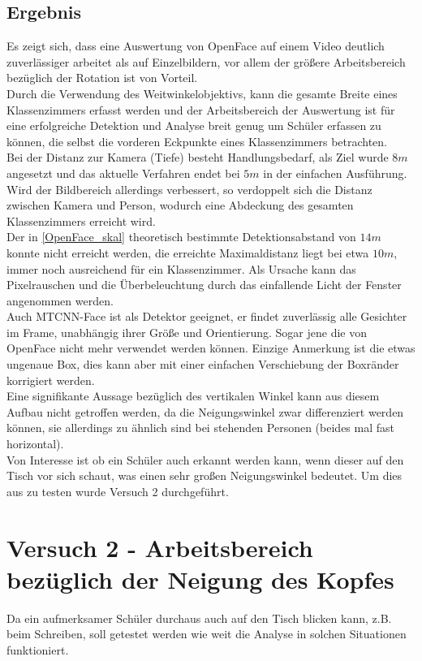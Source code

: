 \subsection{Ergebnis}
Es zeigt sich, dass eine Auswertung von OpenFace auf einem Video deutlich zuverlässiger arbeitet als auf Einzelbildern, vor allem der größere Arbeitsbereich bezüglich der Rotation ist von Vorteil.\\
Durch die Verwendung des Weitwinkelobjektivs, kann die gesamte Breite eines Klassenzimmers erfasst werden und der Arbeitsbereich der Auswertung ist für eine erfolgreiche Detektion und Analyse breit genug um Schüler erfassen zu können, die selbst die vorderen Eckpunkte eines Klassenzimmers betrachten.\\
Bei der Distanz zur Kamera (Tiefe) besteht Handlungsbedarf, als Ziel wurde $8m$ angesetzt und das aktuelle Verfahren endet bei $5m$ in der einfachen Ausführung. Wird der Bildbereich allerdings verbessert, so verdoppelt sich die Distanz zwischen Kamera und Person, wodurch eine Abdeckung des gesamten Klassenzimmers erreicht wird.\\
Der in \autoref{OpenFace_skal} theoretisch bestimmte Detektionsabstand von $14m$ konnte nicht erreicht werden, die erreichte Maximaldistanz liegt bei etwa $10m$, immer noch ausreichend für ein Klassenzimmer. Als Ursache kann das Pixelrauschen und die Überbeleuchtung durch das einfallende Licht der Fenster angenommen werden.\\
Auch MTCNN-Face ist als Detektor geeignet, er findet zuverlässig alle Gesichter im Frame, unabhängig ihrer Größe und Orientierung. Sogar jene die von OpenFace nicht mehr verwendet werden können. Einzige Anmerkung ist die etwas ungenaue Box, dies kann aber mit einer einfachen Verschiebung der Boxränder korrigiert werden.\\
Eine signifikante Aussage bezüglich des vertikalen Winkel kann aus diesem Aufbau nicht getroffen werden, da die Neigungswinkel zwar differenziert werden können, sie allerdings zu ähnlich sind bei stehenden Personen (beides mal fast horizontal).\\
Von Interesse ist ob ein Schüler auch erkannt werden kann, wenn dieser auf den Tisch vor sich schaut, was einen sehr großen Neigungswinkel bedeutet. Um dies aus zu testen wurde Versuch 2 durchgeführt.
\section{Versuch 2 - Arbeitsbereich bezüglich der Neigung des Kopfes}
Da ein aufmerksamer Schüler durchaus auch auf den Tisch blicken kann, z.B. beim Schreiben, soll getestet werden wie weit die Analyse in solchen Situationen funktioniert.

